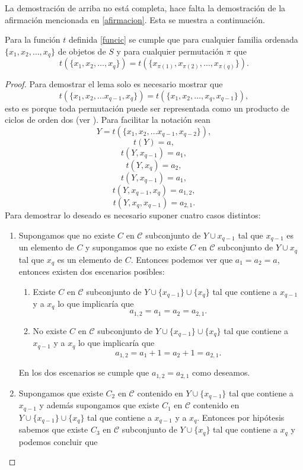 La demostración de arriba no está completa, hace falta la demostración de la afirmación mencionada en \ref{afirmacion}. Esta se muestra a continuación.

\begin{lem}
Para la función $t$ definida \ref{funcic} se cumple que para cualquier familia ordenada $\{x_1,x_2,\dots,x_q\}$ de objetos de $S$ y para cualquier permutación $\pi$ que 
$$t(\{x_1,x_2,\dots,x_q\}) = t(\{x_{\pi(1)},x_{\pi(2)},\dots,x_{\pi(q)}\}).$$
\end{lem}

\begin{proof}
Para demostrar el lema solo es necesario mostrar que 
$$t(\{x_1,x_2,\dots x_{q-1},x_q\}) = t(\{x_1,x_2,\dots,x_q,x_{q-1}\}), $$
esto es porque toda permutación puede ser representada como un producto de ciclos de orden dos (ver \cite{moderna}). Para facilitar la notación sean 
$$Y = t(\{x_1,x_2,\dots x_{q-1},x_{q-2}\}),$$
$$t(Y)=a,$$
$$t(Y,x_{q-1}) = a_1,$$
$$t(Y,x_{q}) = a_2,$$
$$t(Y,x_{q-1}) = a_1,$$
$$t(Y,x_{q-1},x_q) = a_{1,2},$$
$$t(Y,x_{q},x_{q-1}) = a_{2,1}.$$
Para demostrar lo deseado es necesario suponer cuatro casos distintos:
\begin{enumerate}
\item Supongamos que no existe $C$ en $\mathcal{C}$ subconjunto de $Y \cup {x_{q-1}}$ tal que $x_{q-1}$ es un elemento de $C$ y supongamos que no existe $C$ en $\mathcal{C}$ subconjunto de $Y \cup {x_{q}}$ tal que $x_{q}$ es un elemento de $C$. Entonces podemos ver que $a_1 = a_2 = a$, entonces existen dos escenarios posibles: 
\begin{enumerate}
\item Existe $C$ en $\mathcal{C}$ subconjunto de $Y \cup \{ x_{q-1}\} \cup \{x_q\}$ tal que contiene a $x_{q-1}$ y a $x_q$ lo que implicaría que $$a_{1,2}=a_1 =a_2 = a_{2,1}.$$
\item No existe $C$ en $\mathcal{C}$ subconjunto de $Y \cup \{ x_{q-1}\} \cup \{x_q\}$ tal que contiene a $x_{q-1}$ y a $x_q$ lo que implicaría que $$a_{1,2}=a_1 +1 =a_2 +1 = a_{2,1}.$$
\end{enumerate}
En los dos escenarios se cumple que $a_{1,2}=a_{2,1}$ como deseamos. 
\item Supongamos que existe $C_2$ en $\mathcal{C}$ contenido en $Y \cup \{ x_{q-1}\}$ tal que contiene a $x_{q-1}$ y además supongamos que existe $C_1$ en $\mathcal{C}$ contenido en $Y \cup \{ x_{q-1}\} \cup \{x_q\}$ tal que contiene a $x_{q-1}$ y a $x_q$. Entonces por hipótesis sabemos que existe $C_3$ en $\mathcal{C}$ subconjunto de $Y \cup \{ x_{q}\}$ tal que contiene a $x_{q}$ y podemos concluir que 

\end{enumerate}
\end{proof}
